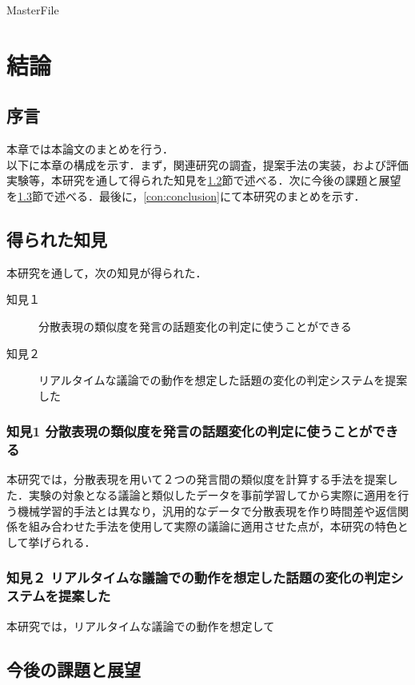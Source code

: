 \expandafter\ifx\csname MasterFile\endcsname\relax
\def\SubFile{hoge}


\setcounter{chapter}{5}
\fi
\cleardoublepage
\chapter{結論}
\label{con:chapter}

\section{序言}
\label{con:introduction}
本章では本論文のまとめを行う．\\
以下に本章の構成を示す．まず，関連研究の調査，提案手法の実装，および評価実験等，本研究を通して得られた知見を\ref{con:knowledge}節で述べる．次に今後の課題と展望を\ref{con:future_work}節で述べる．最後に，\ref{con:conclusion}にて本研究のまとめを示す．

\section{得られた知見}
\label{con:knowledge}
本研究を通して，次の知見が得られた．
\begin{description}
  \item[知見１] 分散表現の類似度を発言の話題変化の判定に使うことができる
  \item[知見２] リアルタイムな議論での動作を想定した話題の変化の判定システムを提案した
\end{description}

\subsection*{知見1 分散表現の類似度を発言の話題変化の判定に使うことができる}
本研究では，分散表現を用いて２つの発言間の類似度を計算する手法を提案した．実験の対象となる議論と類似したデータを事前学習してから実際に適用を行う機械学習的手法とは異なり，汎用的なデータで分散表現を作り時間差や返信関係を組み合わせた手法を使用して実際の議論に適用させた点が，本研究の特色として挙げられる．
\subsection*{知見２ リアルタイムな議論での動作を想定した話題の変化の判定システムを提案した}
本研究では，リアルタイムな議論での動作を想定して

\section{今後の課題と展望}
\label{con:future_work}


